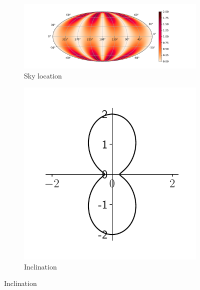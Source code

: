 \begin{figure}
	\centering
	\begin{subfigure}[b]{.72\linewidth}
		\includegraphics[width=\linewidth]{chapters/foundations/sections/cbc_searches/images/sky_location_power.pdf}
		\caption{Sky location}\label{fig:sky_location_influence}
	\end{subfigure}
	\begin{subfigure}[b]{.27\linewidth}
	\includegraphics[width=\linewidth]{chapters/foundations/sections/cbc_searches/images/angular_power_distribution.pdf}
	\caption{Inclination}\label{fig:angle_power}
	\end{subfigure}

\end{figure}

